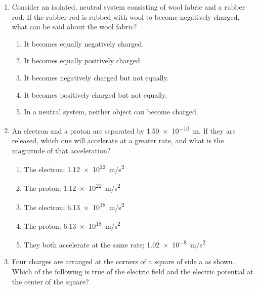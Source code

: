 \documentclass[12pt]{article}
\begin{document}
\begin{enumerate}[leftmargin=50pt,label=\underline{\hspace{0.4in}} \arabic*.]
\item Consider an isolated, neutral system consisting of wool fabric and a
  rubber rod. If the rubber rod is rubbed with wool to become negatively
  charged, what can be said about the wool fabric?
  \begin{enumerate}[noitemsep,topsep=0pt,leftmargin=18pt,label=(\Alph*)]
  \item It becomes equally negatively charged.
  \item It becomes equally positively charged.
  \item It becomes negatively charged but not equally.
  \item It becomes positively charged but not equally.
  \item In a neutral system, neither object can become charged.
  \end{enumerate}

\item An electron and a proton are separated by \SI{1.50e-10}{m}. If they are
  released, which one will accelerate at a greater rate, and what is the
  magnitude of that acceleration?
  \begin{enumerate}[noitemsep,topsep=0pt,leftmargin=18pt,label=(\Alph*)]
  \item The electron; \SI{1.12e22}{m/s^2}
  \item The proton; \SI{1.12e22}{m/s^2}
  \item The electron; \SI{6.13e18}{m/s^2}
  \item The proton; \SI{6.13e18}{m/s^2}
  \item They both accelerate at the same rate; \SI{1.02e-8}{m/s^2}
  \end{enumerate}

\item Four charges are arranged at the corners of a square of side a as shown.
  Which of the following is true of the electric field and the electric
  potential at the center of the square?


\end{enumerate}
\end{document}
